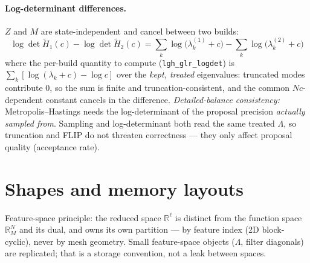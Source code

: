 \documentclass[11pt]{article}
\newcommand{\Ht}{\widetilde{H}}
\begin{document}
\paragraph{Log-determinant differences.}  $Z$ and $M$ are state-independent and
cancel between two builds:
\begin{equation}
\log\det \Ht_1(c) - \log\det \Ht_2(c)
  = \sum_k \log\!\big(\lambda^{(1)}_k + c\big) - \sum_k \log\!\big(\lambda^{(2)}_k + c\big)
\end{equation}
where the per-build quantity to compute (\texttt{lgh\_glr\_logdet}) is
$\sum_k [\log(\lambda_k + c) - \log c]$ over the \emph{kept, treated} eigenvalues:
truncated modes contribute $0$, so the sum is finite and truncation-consistent, and
the common $Nc$-dependent constant cancels in the difference.
\emph{Detailed-balance consistency:} Metropolis--Hastings needs the log-determinant
of the proposal precision \emph{actually sampled from}.  Sampling and
log-determinant both read the same treated $\Lambda$, so truncation and FLIP do not
threaten correctness --- they only affect proposal quality (acceptance rate).

\section{Shapes and memory layouts}

Feature-space principle: the reduced space $\mathbb{R}^\ell$ is distinct from the
function space $\mathbb{R}^N_M$ and its dual, and owns its own partition --- by
feature index (2D block-cyclic), never by mesh geometry.  Small feature-space
objects ($\Lambda$, filter diagonals) are replicated; that is a storage convention,
not a leak between spaces.
\end{document}
